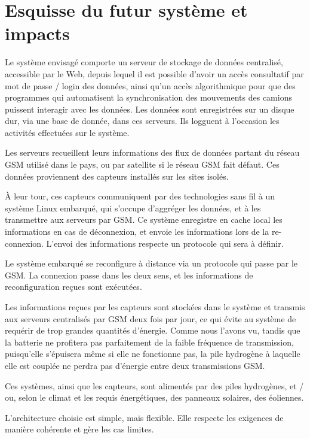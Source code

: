 \section{Esquisse du futur système et impacts}

Le système envisagé comporte un serveur de stockage de données centralisé, accessible par le Web, depuis lequel il est possible d’avoir un accès consultatif par mot de passe / login des données, ainsi qu’un accès algorithmique pour que des programmes qui automatisent la synchronisation des mouvements des camions puissent interagir avec les données. Les données sont enregistrées sur un disque dur, via une base de donnée, dans ces serveurs. Ils logguent à l’occasion les activités effectuées sur le système.

Les serveurs recueillent leurs informations des flux de données partant du réseau GSM utilisé dans le pays, ou par satellite si le réseau GSM fait défaut. Ces données proviennent des capteurs installés sur les sites isolés.

À leur tour, ces capteurs communiquent par des technologies sans fil à un système Linux embarqué, qui s’occupe d’aggréger les données, et à les transmettre aux serveurs par GSM. Ce système enregistre en cache local les informations en cas de déconnexion, et envoie les informations lors de la re-connexion. L’envoi des informations respecte un protocole qui sera à définir.

Le système embarqué se reconfigure à distance via un protocole qui passe par le GSM. La connexion passe dans les deux sens, et les informations de reconfiguration reçues sont exécutées.

Les informations reçues par les capteurs sont stockées dans le système et transmis aux serveurs centralisés par GSM deux fois par jour, ce qui évite au système de requérir de trop grandes quantités d’énergie. Comme nous l’avons vu, tandis que la batterie ne profitera pas parfaitement de la faible fréquence de transmission, puisqu’elle s’épuisera même si elle ne fonctionne pas, la pile hydrogène à laquelle elle est couplée ne perdra pas d’énergie entre deux transmissions GSM.

Ces systèmes, ainsi que les capteurs, sont alimentés par des piles hydrogènes, et / ou, selon le climat et les requis énergétiques, des panneaux solaires, des éoliennes.

L’architecture choisie est simple, mais flexible. Elle respecte les exigences de manière cohérente et gère les cas limites.

